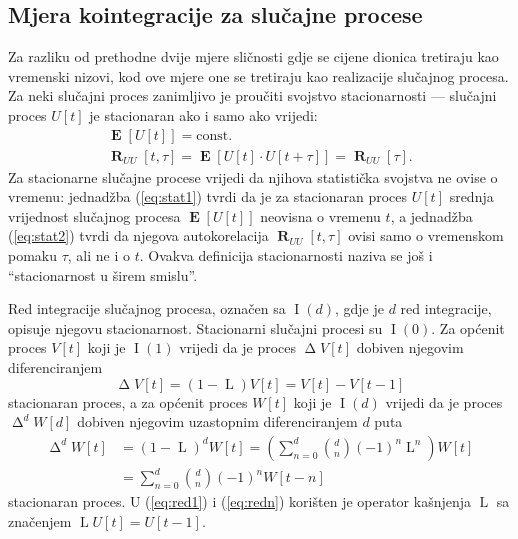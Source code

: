 \documentclass[lmodern, utf8, diplomski, numeric]{fer}
\newcommand{\E}[1]{\operatorname{\mathbf{E}}\left[#1\right]}
\newcommand{\R}[2]{\operatorname{\mathbf{R}}_{#1}\left[#2\right]}
\newcommand{\I}[1]{\operatorname{\mathrm{I}}\left(#1\right)}
\newcommand{\diff}{\operatorname{\mathrm{\Delta}}}
\newcommand{\diffn}[1]{\operatorname{\mathrm{\Delta}}^d}
\newcommand{\lag}{\operatorname{\mathrm{L}}}
\begin{document}
  \subsection{Mjera kointegracije za slučajne procese}
  Za razliku od prethodne dvije mjere sličnosti gdje se cijene dionica tretiraju kao vremenski nizovi, kod ove mjere one se tretiraju kao realizacije slučajnog procesa.
  Za neki slučajni proces zanimljivo je proučiti svojstvo stacionarnosti --- slučajni proces $U\left[t\right]$ je stacionaran ako i samo ako vrijedi:
  \begin{gather}
  \label{eq:stat1}
  \E{U\left[t\right]} = \mathrm{const.}\\
  \label{eq:stat2}
  \R{UU}{t, \tau} = \E{U\left[t\right] \cdot U\left[t + \tau\right]} = \R{UU}{\tau}.
  \end{gather}
  Za stacionarne slučajne procese vrijedi da njihova statistička svojstva ne ovise o vremenu:
  jednadžba (\ref{eq:stat1}) tvrdi da je za stacionaran proces $U\left[t\right]$ srednja vrijednost slučajnog procesa $\E{U\left[t\right]}$ neovisna o vremenu $t$, a jednadžba (\ref{eq:stat2}) tvrdi da njegova autokorelacija $\R{UU}{t, \tau}$ ovisi samo o vremenskom pomaku $\tau$, ali ne i o $t$.
  Ovakva definicija stacionarnosti naziva se još i ``stacionarnost u širem smislu''.
  
  Red integracije slučajnog procesa, označen sa $\I{d}$, gdje je $d$ red integracije, opisuje njegovu stacionarnost.
  Stacionarni slučajni procesi su $\I{0}$.
  Za općenit proces $V\left[t\right]$ koji je $\I{1}$ vrijedi da je proces $\diff V\left[t\right]$ dobiven njegovim diferenciranjem
  \begin{equation}
  \label{eq:red1}
  \diff V\left[t\right] = \left(1 - \lag\right) V\left[t\right] = V\left[t\right] - V\left[t - 1\right]
  \end{equation}
  stacionaran proces, a za općenit proces $W\left[t\right]$ koji je $\I{d}$ vrijedi da je proces $\diffn{d} W\left[d\right]$ dobiven njegovim uzastopnim diferenciranjem $d$ puta
  \begin{align}
  \diffn{d} W\left[t\right] &= \left(1 - \lag\right)^d W\left[t\right] = \left( \sum_{n = 0}^{d} \binom{d}{n} \left(-1\right)^n\lag^n \right) W\left[t\right] \nonumber \\
  \label{eq:redn}
  &= \sum_{n = 0}^{d} \binom{d}{n} \left(-1\right)^n W\left[t - n\right]
  \end{align}
  stacionaran proces.
  U (\ref{eq:red1}) i (\ref{eq:redn}) korišten je operator kašnjenja $\lag$ sa značenjem $\lag U\left[t\right] = U\left[t - 1\right]$.
  
\end{document}
